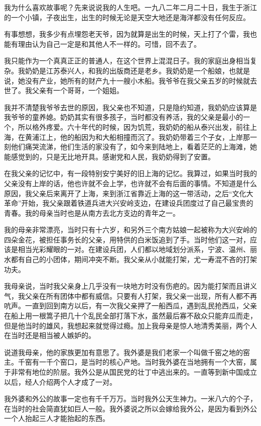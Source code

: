 我为什么喜欢故事呢？先来说说我的人生吧。一九八二年二月二十日，我生于浙江的一个小镇，子夜出生，出生的时候无论是天空大地还是海洋都没有任何反应。

有事想想，我多少有点埋怨老天爷，因为就算是出生的时候，天上打了个雷，我也能有理由认为自己一定是和其他人不一样的。可惜，回不去了。

我只能作为一个真真正正的普通人，在这个世界上混混日子。我的家庭出身相当复杂。我奶奶是江苏泰兴人，和我的出版商还是老乡。我奶奶是一个船娘，也就是说，她没有产业，她所有的财产九十一艘小木船。我爷爷在我父亲五岁的时候就去世了。我父亲有一个哥哥，一个姐姐。

我并不清楚我爷爷去世的原因，我父亲也不知道，只是隐约知道，我奶奶应该算是我爷爷的童养媳。奶奶其实有很多孩子，当时都没有养活，我的父亲是最小的一个，所以格外疼爱。六十年代的时候，因为饥荒，我奶奶的船从泰兴出发，前往上海，在黄浦江上，他的船因为和大船相撞而沉了。我奶奶带着三个子女，上岸那一刻他们痛哭流涕，他们生活的家没有了，如今来到陆地上，看着茫茫的上海滩，她能感觉到的，只是无比地开具。感谢党和人民，我奶奶得到了安置。

在我父亲的记忆中，有一段特别安宁美好的旧上海的记忆。我算过，如果当时我的父亲没有上岸的话，他也许就不会上学，也许就不会有后面的事情。不知道是什么原因，我父亲后来离开了上海，来到浙江省靠近上海的这一带活动，之后“文化大革命”开始，我父亲跟着铁道兵进大兴安岭支边，在建设兵团度过了自己最宝贵的青春。我的母亲当时也是从南方去北方支边的青年之一。

我的母亲非常漂亮，当时只有十六岁，和另外三个南方姑娘一起被称为大兴安岭的四朵金花，被担任事务长的父亲，用特供的白米饭追到了手。当时他们这一对，应该是相当光彩耀眼的一对。在建设兵团，人们都以地域划分派系，宁波、温州、丽水都有自己的小团体，期间冲突不断。我父亲从小就能打架，尤一寿混不吝的打架功夫。

我母亲说，当时我父亲身上几乎没有一块地方时没有伤疤的。因为能打架而且讲义气，我父亲在所有团体中都有威信。只要有人打架，我父亲一出现，所有人都不再吭声。一直到回到南方以后，有一次我父亲押了一船西瓜，遇到乱民抢西瓜，父亲在船上用一根篙子把几十个乱民全部打落下水，虽然最后寡不敌众只能弃瓜而走，但是他当时的雄风，我想起来就觉得过瘾。加上我母亲是惊人地清秀美丽，两个人在当时还是相当被人嫉妒的。

说道我母亲，他的家族更加有意思了。我外婆是我们老家一个叫做千窑之地的窑主。千窑有一千个窑口，是当时的核心产地。当时我外婆在当地拥有一个大窑，属于非常有地位的阶层。我外公是从国民党的壮丁中逃出来的。一直等到新中国成立以后，经人介绍两个人才成了一对。

我外婆和外公的故事一定也有千千万万。当时我外公天生神力。一米八六的个子，在当时的社会简直犹如巨人一般。我外婆说之所以会嫁给我外公，是因为看到外公一个人抬起三人才能抬起的东西。

